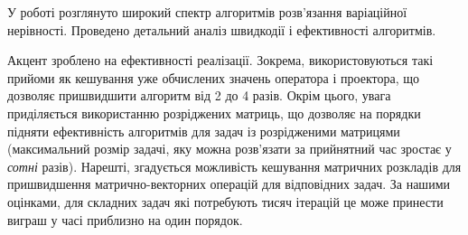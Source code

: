 У роботі розглянуто широкий спектр алгоритмів розв'язання варіаційної нерівності. Проведено детальний аналіз швидкодії і ефективності алгоритмів. \medskip

Акцент зроблено  на ефективності реалізації. Зокрема, використовуються такі прийоми як кешування уже обчислених значень оператора і проектора, що дозволяє пришвидшити алгоритм від 2 до 4 разів. Окрім цього, увага приділяється використанню розріджених матриць, що дозволяє на порядки підняти ефективність алгоритмів для задач із розрідженими матрицями (максимальний розмір задачі, яку можна розв'язати за прийнятний час зростає у \emph{сотні} разів). Нарешті, згадується можливість кешування матричних розкладів для пришвидшення мат\-рич\-но-век\-тор\-них операцій для відповідних задач. За нашими оцінками, для складних задач які потребують тисяч ітерацій це може принести виграш у часі приблизно на один порядок.